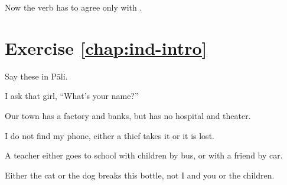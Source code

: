 
Now the verb has to agree only with .

\section*{Exercise \ref{chap:ind-intro}}
Say these in P\=ali.
\begin{compactenum}
\item I ask that girl, ``What's your name?''
\item Our town has a factory and banks, but has no hospital and theater.
\item I do not find my phone, either a thief takes it or it is lost.
\item A teacher either goes to school with children by bus, or with a friend by car.
\item Either the cat or the dog breaks this bottle, not I and you or the children.
\end{compactenum}
